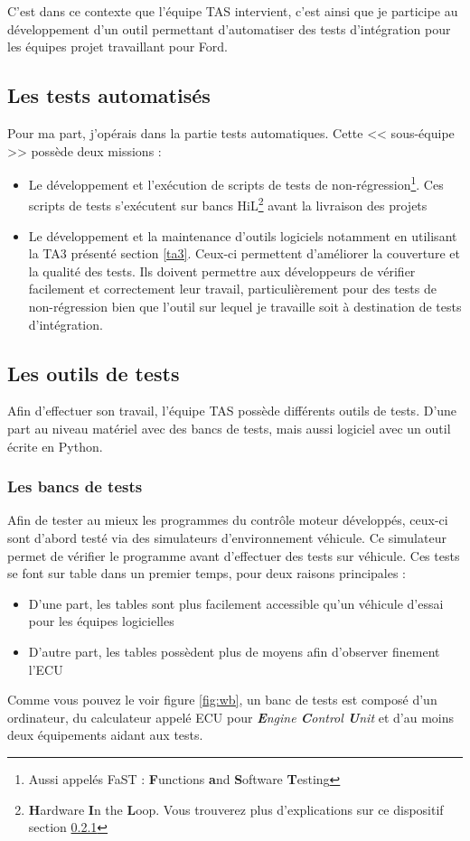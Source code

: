 C'est dans ce contexte que l'équipe TAS intervient, c'est ainsi que je participe au développement d'un outil permettant d'automatiser des tests d'intégration pour les équipes projet travaillant pour Ford.
 		\subsection{Les tests automatisés}

 		Pour ma part, j'opérais dans la partie tests automatiques. Cette << sous-équipe >> possède deux missions : 
 		\begin{itemize}
 			\item Le développement et l'exécution de scripts de tests de non-régression\footnote{Aussi appelés FaST : \textbf{F}unctions \textbf{a}nd \textbf{S}oftware \textbf{T}esting}. Ces scripts de tests s'exécutent sur bancs HiL\footnote{\textbf{H}ardware \textbf{I}n the \textbf{L}oop. Vous trouverez plus d'explications sur ce dispositif section \ref{wb}} avant la livraison des projets
 			\item Le développement et la maintenance d'outils logiciels notamment en utilisant la TA3 présenté section \ref{ta3}. Ceux-ci permettent d'améliorer la couverture et la qualité des tests. Ils doivent permettre aux développeurs de vérifier facilement et correctement leur travail, particulièrement pour des tests de non-régression bien que l'outil sur lequel je travaille soit à destination de tests d'intégration.
 		\end{itemize}
	\subsection{Les outils de tests}
	Afin d'effectuer son travail, l'équipe TAS possède différents outils de tests. D'une part au niveau matériel avec des bancs de tests, mais aussi logiciel avec un outil écrite en Python.
	
		\subsubsection{Les bancs de tests}\label{wb}
		Afin de tester au mieux les programmes du contrôle moteur développés, ceux-ci sont d'abord testé via des simulateurs d'environnement véhicule. Ce simulateur permet de vérifier le programme avant d'effectuer des tests sur véhicule. Ces tests se font sur table dans un premier temps, pour deux raisons principales : 
		\begin{itemize}
			\item D'une part, les tables sont plus facilement accessible qu'un véhicule d'essai pour les équipes logicielles
			\item D'autre part, les tables possèdent plus de moyens afin d'observer finement l'ECU
		\end{itemize}		
		Comme vous pouvez le voir figure \ref{fig:wb}, un banc de tests est composé d'un ordinateur, du calculateur appelé ECU pour \textit{\textbf{E}ngine \textbf{C}ontrol \textbf{U}nit} et d'au moins deux équipements aidant aux tests. 
		
